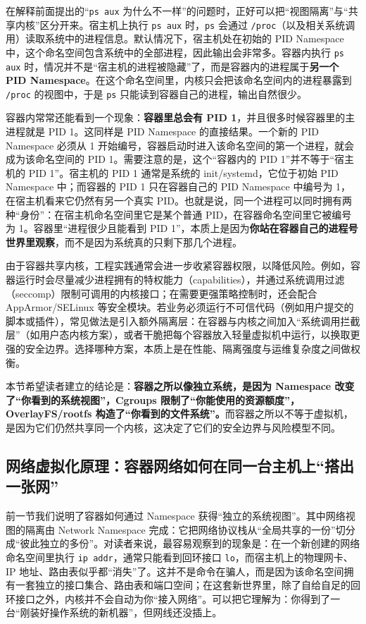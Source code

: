 在解释前面提出的“\texttt{ps aux} 为什么不一样”的问题时，正好可以把“视图隔离”与“共享内核”区分开来。宿主机上执行 \texttt{ps aux} 时，\texttt{ps} 会通过 \texttt{/proc}（以及相关系统调用）读取系统中的进程信息。默认情况下，宿主机处在初始的 PID Namespace 中，这个命名空间包含系统中的全部进程，因此输出会非常多。容器内执行 \texttt{ps aux} 时，情况并不是“宿主机的进程被隐藏”了，而是容器内的进程属于\textbf{另一个 PID Namespace}。在这个命名空间里，内核只会把该命名空间内的进程暴露到 \texttt{/proc} 的视图中，于是 \texttt{ps} 只能读到容器自己的进程，输出自然很少。

容器内常常还能看到一个现象：\textbf{容器里总会有 PID 1}，并且很多时候容器里的主进程就是 PID 1。这同样是 PID Namespace 的直接结果。一个新的 PID Namespace 必须从 1 开始编号，容器启动时进入该命名空间的第一个进程，就会成为该命名空间的 PID 1。需要注意的是，这个“容器内的 PID 1”并不等于“宿主机的 PID 1”。宿主机的 PID 1 通常是系统的 init/systemd，它位于初始 PID Namespace 中；而容器的 PID 1 只在容器自己的 PID Namespace 中编号为 1，在宿主机看来它仍然有另一个真实 PID。也就是说，同一个进程可以同时拥有两种“身份”：在宿主机命名空间里它是某个普通 PID，在容器命名空间里它被编号为 1。容器里“进程很少且能看到 PID 1”，本质上是因为\textbf{你站在容器自己的进程号世界里观察}，而不是因为系统真的只剩下那几个进程。

由于容器共享内核，工程实践通常会进一步收紧容器权限，以降低风险。例如，容器运行时会尽量减少进程拥有的特权能力（capabilities），并通过系统调用过滤（seccomp）限制可调用的内核接口；在需要更强策略控制时，还会配合 AppArmor/SELinux 等安全模块。若业务必须运行不可信代码（例如用户提交的脚本或插件），常见做法是引入额外隔离层：在容器与内核之间加入“系统调用拦截层”（如用户态内核方案），或者干脆把每个容器放入轻量虚拟机中运行，以换取更强的安全边界。选择哪种方案，本质上是在性能、隔离强度与运维复杂度之间做权衡。

本节希望读者建立的结论是：\textbf{容器之所以像独立系统，是因为 Namespace 改变了“你看到的系统视图”，Cgroups 限制了“你能使用的资源额度”，OverlayFS/rootfs 构造了“你看到的文件系统”。}而容器之所以不等于虚拟机，是因为它们仍然共享同一个内核，这决定了它们的安全边界与风险模型不同。

\subsection{网络虚拟化原理：容器网络如何在同一台主机上“搭出一张网”}

前一节我们说明了容器如何通过 Namespace 获得“独立的系统视图”。其中网络视图的隔离由 Network Namespace 完成：它把网络协议栈从“全局共享的一份”切分成“彼此独立的多份”。对读者来说，最容易观察到的现象是：在一个新创建的网络命名空间里执行 \texttt{ip addr}，通常只能看到回环接口 \texttt{lo}，而宿主机上的物理网卡、IP 地址、路由表似乎都“消失”了。这并不是命令在骗人，而是因为该命名空间拥有一套独立的接口集合、路由表和端口空间；在这套新世界里，除了自给自足的回环接口之外，内核并不会自动为你“接入网络”。可以把它理解为：你得到了一台“刚装好操作系统的新机器”，但网线还没插上。 %

